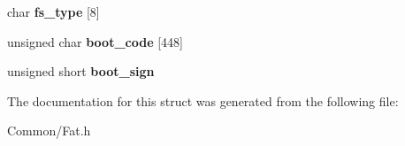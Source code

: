 \begin{DoxyCompactItemize}
\item 
\mbox{\label{structmsdos__boot__sector_a3d8a277ac25a54d91ae5b2e5114612e7}} 
char {\bfseries fs\+\_\+type} \mbox{[}8\mbox{]}
\item 
\mbox{\label{structmsdos__boot__sector_af8304869ad614a31c664cb834748c183}} 
unsigned char {\bfseries boot\+\_\+code} \mbox{[}448\mbox{]}
\item 
\mbox{\label{structmsdos__boot__sector_ab0cdceb3d07791c00a2848cc2687c2ce}} 
unsigned short {\bfseries boot\+\_\+sign}
\end{DoxyCompactItemize}


The documentation for this struct was generated from the following file\+:\begin{DoxyCompactItemize}
\item 
Common/Fat.\+h\end{DoxyCompactItemize}
